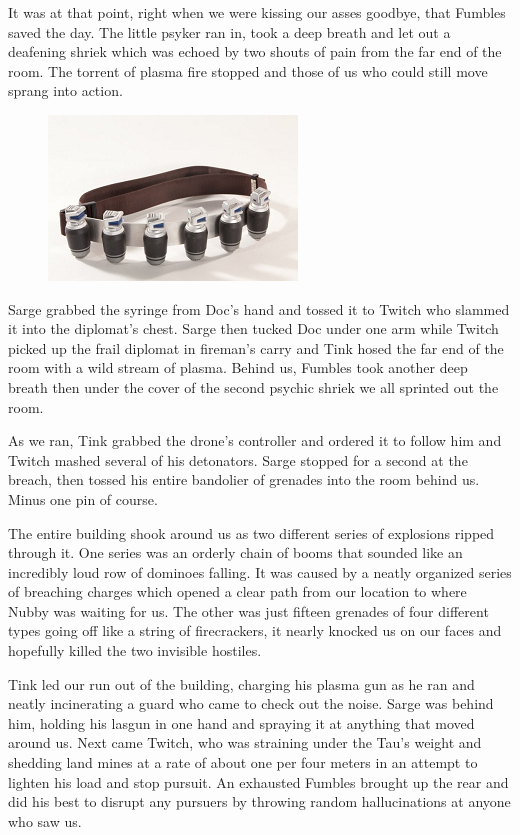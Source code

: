 It was at that point, right when we were kissing our asses goodbye, that Fumbles saved the day. 
The little psyker ran in, took a deep breath and let out a deafening shriek which was echoed by two shouts of pain from the far end of the room. 
The torrent of plasma fire stopped and those of us who could still move sprang into action.

\begin{figure}
	\begin{center}
		\includegraphics[width=\figwidth]{pics/10/64.png}
	\end{center}
\end{figure}
Sarge grabbed the syringe from Doc's hand and tossed it to Twitch who slammed it into the diplomat's chest. 
Sarge then tucked Doc under one arm while Twitch picked up the frail diplomat in fireman's carry and Tink hosed the far end of the room with a wild stream of plasma. 
Behind us, Fumbles took another deep breath then under the cover of the second psychic shriek we all sprinted out the room. 


As we ran, Tink grabbed the drone's controller and ordered it to follow him and Twitch mashed several of his detonators. 
Sarge stopped for a second at the breach, then tossed his entire bandolier of grenades into the room behind us. 
Minus one pin of course.

The entire building shook around us as two different series of explosions ripped through it. 
One series was an orderly chain of booms that sounded like an incredibly loud row of dominoes falling. 
It was caused by a neatly organized series of breaching charges which opened a clear path from our location to where Nubby was waiting for us. 
The other was just fifteen grenades of four different types going off like a string of firecrackers, it nearly knocked us on our faces and hopefully killed the two invisible hostiles.

Tink led our run out of the building, charging his plasma gun as he ran and neatly incinerating a guard who came to check out the noise. 
Sarge was behind him, holding his lasgun in one hand and spraying it at anything that moved around us. 
Next came Twitch, who was straining under the Tau's weight and shedding land mines at a rate of about one per four meters in an attempt to lighten his load and stop pursuit. 
An exhausted Fumbles brought up the rear and did his best to disrupt any pursuers by throwing random hallucinations at anyone who saw us.


